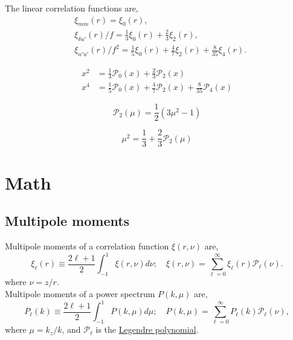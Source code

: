 \documentclass[a4paper,11pt, fleqn]{article}
\begin{document}
The linear correlation functions are,
\begin{align}
  &\xi_{mm}(r) = \xi_0(r),\\
  &\xi_{\delta u'}(r)/f = \frac{1}{3} \xi_0(r) + \frac{2}{3} \xi_2(r),\\
  &\xi_{u'u'}(r)/f^2 = \frac{1}{5} \xi_0(r) + \frac{4}{7} \xi_2(r)
                      +\frac{8}{35} \xi_4(r).
\end{align}

\begin{align}
  x^2 &= \frac{1}{3} \mathcal{P}_0(x) + \frac{2}{3} \mathcal{P}_2(x)\\
  x^4 &= \frac{1}{5}\mathcal{P}_0(x)
  + \frac{4}{7} \mathcal{P}_2(x)
  + \frac{8}{35} \mathcal{P}_4(x)
\end{align}
  
\clearpage
\begin{equation}
  \mathcal{P}_2(\mu) = \frac{1}{2}\left( 3 \mu^2 - 1 \right)
\end{equation}

\begin{equation}
  \mu^2 = \frac{1}{3} + \frac{2}{3} \mathcal{P}_2(\mu)
\end{equation}


\clearpage
\section{Math}

\subsection{Multipole moments}

Multipole moments of a correlation function $\xi(r,\nu)$ are,
\begin{equation}
  \xi_\ell(r) \equiv \frac{2 \ell + 1}{2} \int_{-1}^1 \xi(r, \nu) d\nu;\quad
  \xi(r, \nu) = \sum_{\ell=0}^\infty \xi_\ell(r) \mathcal{P}_\ell(\nu).
\end{equation}
where $\nu = z/r$.\\

Multipole moments of a power spectrum $P(k, \mu)$ are,
\begin{equation}
  P_\ell(k) \equiv \frac{2 \ell + 1}{2} \int_{-1}^1 P(k, \mu) d\mu;\quad
  P(k, \mu) = \sum_{\ell=0}^\infty P_\ell(k) \mathcal{P}_\ell(\nu),
\end{equation}
where $\mu = k_z/k$, and $\mathcal{P}_\ell$ is the \hyperref[sec:legendre]{Legendre polynomial}.\\
\end{document}
